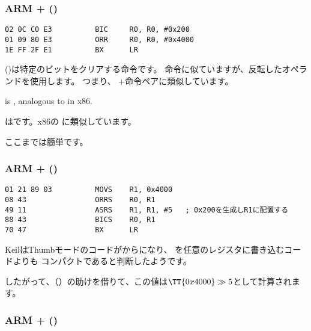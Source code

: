 \subsubsection{ARM + \OptimizingKeilVI (\ARMMode)}

\begin{lstlisting}[caption=\OptimizingKeilVI (\ARMMode),style=customasmARM]
02 0C C0 E3          BIC     R0, R0, #0x200
01 09 80 E3          ORR     R0, R0, #0x4000
1E FF 2F E1          BX      LR
\end{lstlisting}

 ()は特定のビットをクリアする命令です。
\AND 命令に似ていますが、反転したオペランドを使用します。
つまり、 \NOT+\AND 命令ペアに類似しています。

 is , analogous to \OR in x86.

 はです。x86の \OR に類似しています。

ここまでは簡単です。

\subsubsection{ARM + \OptimizingKeilVI (\ThumbMode)}

\begin{lstlisting}[caption=\OptimizingKeilVI (\ThumbMode),style=customasmARM]
01 21 89 03          MOVS    R1, 0x4000
08 43                ORRS    R0, R1
49 11                ASRS    R1, R1, #5   ; 0x200を生成しR1に配置する
88 43                BICS    R0, R1
70 47                BX      LR
\end{lstlisting}

KeilはThumbモードのコードがからになり、
を任意のレジスタに書き込むコードよりも
コンパクトであると判断したようです。


したがって、（\ASRdesc）の助けを借りて、この値は$\TT{0x4000} \gg 5$として計算されます。

\subsubsection{ARM + \OptimizingXcodeIV (\ARMMode)}
\label{anomaly:LLVM}
\myindex{\CompilerAnomaly}

